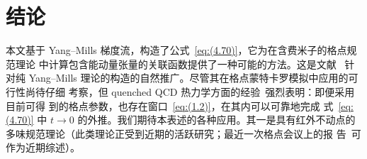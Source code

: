 \section{结论}
\label{sec:6}
本文基于 Yang--Mills 梯度流，构造了公式~\eqref{eq:(4.70)}，它为在含费米子的格点规范理论
中计算包含能动量张量的关联函数提供了一种可能的方法。这是文献~\cite{Suzuki:2013gza}
针对纯 Yang--Mills 理论的构造的自然推广。尽管其在格点蒙特卡罗模拟中应用的可行性尚待仔细
考察，但 quenched QCD 热力学方面的经验~\cite{Asakawa:2013laa}强烈表明：即便采用目前可得
到的格点参数，也存在窗口~\eqref{eq:(1.2)}，在其内可以可靠地完成
式~\eqref{eq:(4.70)} 中 $t\to0$ 的外推。我们期待本表述的各种应用。其一是具有红外不动点的
多味规范理论（此类理论正受到近期的活跃研究；最近一次格点会议上的报
告~\cite{Itou:2013faa,Fodor:2014pqa}可作为近期综述）。
